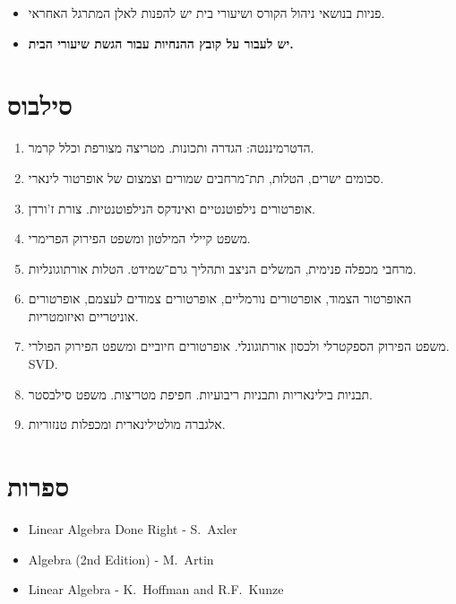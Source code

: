 \documentclass{article}
\begin{document}
\begin{itemize}
\item[-]
פניות בנושאי ניהול הקורס ושיעורי בית יש להפנות לאלן המתרגל האחראי.
\item[-]
\textbf{יש לעבור על קובץ ההנחיות עבור הגשת שיעורי הבית.}
\end{itemize}

\pagebreak

\section*{סילבוס}
\begin{enumerate}
\item הדטרמיננטה: הגדרה ותכונות. מטריצה מצורפת וכלל קרמר.
\item סכומים ישרים, הטלות, תת־מרחבים שמורים וצמצום של אופרטור לינארי.
\item אופרטורים נילפוטנטיים ואינדקס הנילפוטנטיות. צורת ז'ורדן.
\item משפט קיילי המילטון ומשפט הפירוק הפרימרי.
\item מרחבי מכפלה פנימית, המשלים הניצב ותהליך גרם־שמידט. הטלות אורתוגונליות.
\item האופרטור הצמוד, אופרטורים נורמליים, אופרטורים צמודים לעצמם, אופרטורים אוניטריים ואיזומטריות.
\item משפט הפירוק הספקטרלי ולכסון אורתוגונלי. אופרטורים חיוביים ומשפט הפירוק הפולרי. \textenglish{SVD}.
\item תבניות בילינאריות ותבניות ריבועיות. חפיפת מטריצות. משפט סילבסטר.
\item אלגברה מולטילינארית ומכפלות טנזוריות.
\end{enumerate}

\section*{ספרות}
\begin{itemize}
\item[-] \textenglish{Linear Algebra Done Right - S.~Axler}
\item[-] \textenglish{Algebra (2nd Edition) - M.~Artin}
\item[-] \textenglish{Linear Algebra - K.~Hoffman and R.F.~Kunze}
\end{itemize}
\end{document}
